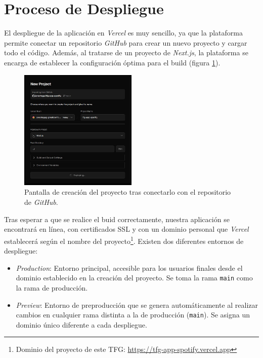 \section{Proceso de Despliegue}

El despliegue de la aplicación en \textit{Vercel} es muy sencillo, ya que la plataforma permite conectar un repositorio \textit{GitHub} para crear un nuevo proyecto y cargar todo el código. Además, al tratarse de un proyecto de \textit{Next.js}, la plataforma se encarga de establecer la configuración óptima para el build (figura \ref{fig:creacion_proyecto}).

\begin{figure}[H]
    \centering
    \includegraphics[width=0.5\textwidth]{figures/despliegue/creacion_proyecto.jpg}
    \caption{Pantalla de creación del proyecto tras conectarlo con el repositorio de \textit{GitHub}.}
    \label{fig:creacion_proyecto}
\end{figure}

Tras esperar a que se realice el buid correctamente, nuestra aplicación se encontrará en línea, con certificados SSL y con un dominio personal que \textit{Vercel} establecerá según el nombre del proyecto\footnote{Dominio del proyecto de este TFG: \href{https://tfg-app-spotify.vercel.app}{https://tfg-app-spotify.vercel.app}}. Existen dos diferentes entornos de despliegue:

\begin{itemize}
    \item \textit{Production}: Entorno principal, accesible para los usuarios finales desde el dominio establecido en la creación del proyecto. Se toma la rama \texttt{main} como la rama de producción.
    \item \textit{Preview}: Entorno de preproducción que se genera automáticamente al realizar cambios en cualquier rama distinta a la de producción (\texttt{main}). Se asigna un dominio único diferente a cada despliegue.
\end{itemize}

